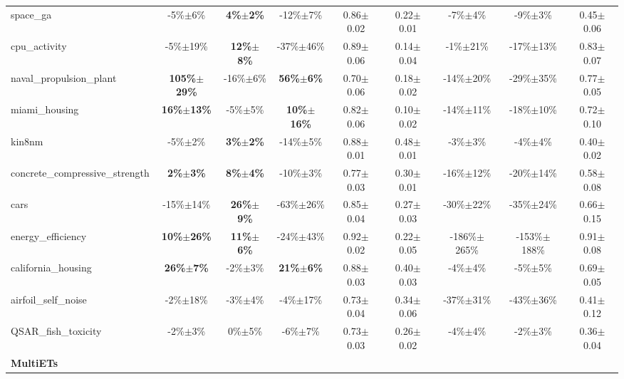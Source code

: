 \begin{table}[t]
\begin{small}
\begin{sc}
{\begin{tabular}{lcccccccc}
space\_ga  &  -5\%$\pm$6\%  &  \textbf{4\%$\pm$2\%}  &  -12\%$\pm$7\%  &  0.86$\pm$0.02  &  0.22$\pm$0.01  &  -7\%$\pm$4\%  &  -9\%$\pm$3\%  &  0.45$\pm$0.06 \\
cpu\_activity  &  -5\%$\pm$19\%  &  \textbf{12\%$\pm$8\%}  &  -37\%$\pm$46\%  &  0.89$\pm$0.06  &  0.14$\pm$0.04  &  -1\%$\pm$21\%  &  -17\%$\pm$13\%  &  0.83$\pm$0.07 \\
naval\_propulsion\_plant  &  \textbf{105\%$\pm$29\%}  &  -16\%$\pm$6\%  &  \textbf{56\%$\pm$6\%}  &  0.70$\pm$0.06  &  0.18$\pm$0.02  &  -14\%$\pm$20\%  &  -29\%$\pm$35\%  &  0.77$\pm$0.05 \\
miami\_housing  &  \textbf{16\%$\pm$13\%}  &  -5\%$\pm$5\%  &  \textbf{10\%$\pm$16\%}  &  0.82$\pm$0.06  &  0.10$\pm$0.02  &  -14\%$\pm$11\%  &  -18\%$\pm$10\%  &  0.72$\pm$0.10 \\
kin8nm  &  -5\%$\pm$2\%  &  \textbf{3\%$\pm$2\%}  &  -14\%$\pm$5\%  &  0.88$\pm$0.01  &  0.48$\pm$0.01  &  -3\%$\pm$3\%  &  -4\%$\pm$4\%  &  0.40$\pm$0.02 \\
concrete\_compressive\_strength  &  \textbf{2\%$\pm$3\%}  &  \textbf{8\%$\pm$4\%}  &  -10\%$\pm$3\%  &  0.77$\pm$0.03  &  0.30$\pm$0.01  &  -16\%$\pm$12\%  &  -20\%$\pm$14\%  &  0.58$\pm$0.08 \\
cars  &  -15\%$\pm$14\%  &  \textbf{26\%$\pm$9\%}  &  -63\%$\pm$26\%  &  0.85$\pm$0.04  &  0.27$\pm$0.03  &  -30\%$\pm$22\%  &  -35\%$\pm$24\%  &  0.66$\pm$0.15 \\
energy\_efficiency  &  \textbf{10\%$\pm$26\%}  &  \textbf{11\%$\pm$6\%}  &  -24\%$\pm$43\%  &  0.92$\pm$0.02  &  0.22$\pm$0.05  &  -186\%$\pm$265\%  &  -153\%$\pm$188\%  &  0.91$\pm$0.08 \\
california\_housing  &  \textbf{26\%$\pm$7\%}  &  -2\%$\pm$3\%  &  \textbf{21\%$\pm$6\%}  &  0.88$\pm$0.03  &  0.40$\pm$0.03  &  -4\%$\pm$4\%  &  -5\%$\pm$5\%  &  0.69$\pm$0.05 \\
airfoil\_self\_noise  &  -2\%$\pm$18\%  &  -3\%$\pm$4\%  &  -4\%$\pm$17\%  &  0.73$\pm$0.04  &  0.34$\pm$0.06  &  -37\%$\pm$31\%  &  -43\%$\pm$36\%  &  0.41$\pm$0.12 \\
QSAR\_fish\_toxicity  &  -2\%$\pm$3\%  &  0\%$\pm$5\%  &  -6\%$\pm$7\%  &  0.73$\pm$0.03  &  0.26$\pm$0.02  &  -4\%$\pm$4\%  &  -2\%$\pm$3\%  &  0.36$\pm$0.04 \\
\cmidrule(lr){1-9}
\textbf{MultiETs} & & & & & & & & \\ \cmidrule(lr){1-9}


\end{tabular}}
\end{sc}
\end{small}
\end{table}
